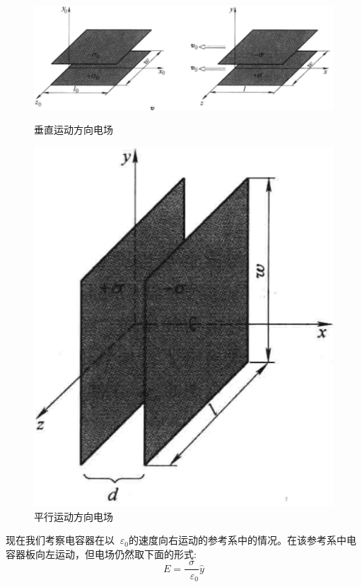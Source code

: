 \documentclass[12pt,a4paper,oneside]{report}
\theoremstyle{definition}
\theoremstyle{remark}
\renewcommand{\v}{\mathop{}\!\varepsilon}
\begin{document}
\begin{figure}[h]
  \centering
  \begin{minipage}[t]{0.6\textwidth}
    \centering
    \includegraphics[width=\textwidth]{5-6.png}
    \caption{垂直运动方向电场}
  \end{minipage}
  \hfill
  \begin{minipage}[t]{0.25\textwidth}
    \centering
    \includegraphics[width=\textwidth]{5-7.png}
    \caption{平行运动方向电场}
  \end{minipage}
\end{figure}

现在我们考察电容器在以$\v_0$的速度向右运动的参考系中的情况。在该参考系中电容器板向左运动，但电场仍然取下面的形式:
\[
E = \frac{\sigma}{\v_0}\hat{y}
\]
\end{document}
